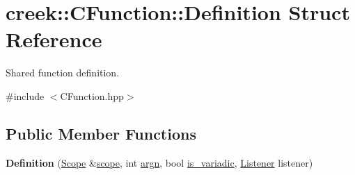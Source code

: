 \hypertarget{structcreek_1_1_c_function_1_1_definition}{}\section{creek\+:\+:C\+Function\+:\+:Definition Struct Reference}
\label{structcreek_1_1_c_function_1_1_definition}


Shared function definition.  




{\ttfamily \#include $<$C\+Function.\+hpp$>$}

\subsection*{Public Member Functions}
\begin{DoxyCompactItemize}
\item 
{\bfseries Definition} (\hyperlink{classcreek_1_1_scope}{Scope} \&\hyperlink{structcreek_1_1_c_function_1_1_definition_ac1d7e89ccc12df67aee1e672358f15b8}{scope}, int \hyperlink{structcreek_1_1_c_function_1_1_definition_a449a127660f382849f43dc4e0393f11a}{argn}, bool \hyperlink{structcreek_1_1_c_function_1_1_definition_ac6af72ba5a693e411f25c9617e370cad}{is\+\_\+variadic}, \hyperlink{classcreek_1_1_c_function_a9499b5501ecc59d9ef8d892991c8fa16}{Listener} listener)\hypertarget{structcreek_1_1_c_function_1_1_definition_ac59b3ef729474fc57e309b082f221ae8}{}\label{structcreek_1_1_c_function_1_1_definition_ac59b3ef729474fc57e309b082f221ae8}

\end{DoxyCompactItemize}
